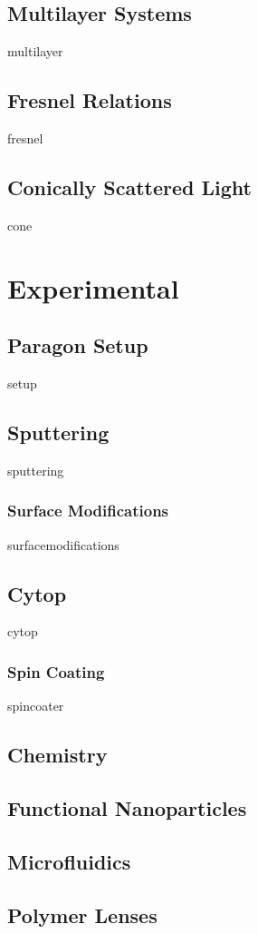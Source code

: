 \documentclass[a4paper,titlepage,onecolumn]{report}
\begin{document}
 \section{Multilayer Systems}
 {multilayer}
 \section{Fresnel Relations}
 {fresnel}
 \section{Conically Scattered Light}
 {cone}

\chapter{Experimental} \label{ch:experimental}
 \section{Paragon Setup}
 {setup}
 \section{Sputtering}
 {sputtering}
  \subsection{Surface Modifications}
  {surfacemodifications}
 \section{Cytop}
 {cytop}
  \subsection{Spin Coating}
  {spincoater}
 \section{Chemistry}
 \section{Functional Nanoparticles}
 \section{Microfluidics}
 \section{Polymer Lenses}
\end{document}
